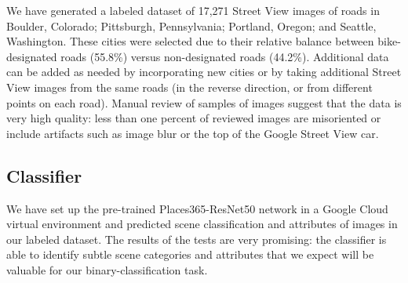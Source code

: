 \documentclass[10pt,twocolumn,letterpaper]{article}
\begin{document}
We have generated a labeled dataset of 17,271 Street View images of roads in Boulder, Colorado; Pittsburgh, Pennsylvania; Portland, Oregon; and Seattle, Washington. These cities were selected due to their relative balance between bike-designated roads (55.8\%) versus non-designated roads (44.2\%). Additional data can be added as needed by incorporating new cities or by taking additional Street View images from the same roads (in the reverse direction, or from different points on each road). Manual review of samples of images suggest that the data is very high quality: less than one percent of reviewed images are misoriented or include artifacts such as image blur or the top of the Google Street View car. 

\subsection{Classifier}

We have set up the pre-trained Places365-ResNet50 network in a Google Cloud virtual environment and predicted scene classification and attributes of images in our labeled dataset. The results of the tests are very promising: the classifier is able to identify subtle scene categories and attributes that we expect will be valuable for our binary-classification task.

{\small


}
\end{document}
